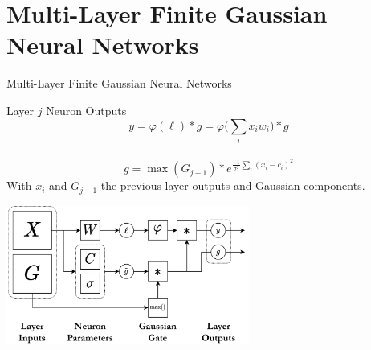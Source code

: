 \documentclass{beamer}
\begin{document}
\section{Multi-Layer Finite Gaussian Neural Networks}

\begin{frame}{Multi-Layer Finite Gaussian Neural Networks}
   \begin{block}{Layer $j$ Neuron Outputs}
        $$ y =  \varphi(\ell)*g = \varphi\Big(\sum_i x_{i} w_{i}\Big) * g $$\\[-0.2em]
        $$ g = \max(G_{j-1}) * e^{\frac{-1}{\sigma^2}\sum_{i}(x_i-c_i)^2}$$
        With $x_{i}$ and $G_{j-1}$ the previous layer outputs and Gaussian components.
    \end{block}
    
     \begin{center}
        \includegraphics[width=0.6\textwidth]{images/multi-layer-fgn/FGN-Network.png}
    \end{center}

\end{frame}
\end{document}
